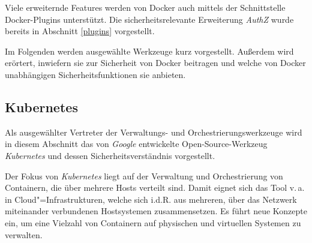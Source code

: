 \documentclass[../main.tex]{subfiles}
\begin{document}
    Viele erweiternde Features werden von Docker auch mittels der Schnittstelle Docker-Plugins unterstützt. Die sicherheitsrelevante Erweiterung \emph{AuthZ} wurde bereits in Abschnitt \ref{plugins} vorgestellt.

    Im Folgenden werden ausgewählte Werkzeuge kurz vorgestellt. Außerdem wird erörtert, inwiefern sie zur Sicherheit von Docker beitragen und welche von Docker unabhängigen Sicherheitsfunktionen sie anbieten.



    \subsection{Kubernetes}
      Als ausgewählter Vertreter der Verwaltungs- und Orchestrierungswerkzeuge wird in diesem Abschnitt das von \emph{Google} entwickelte Open-Source-Werkzeug \emph{Kubernetes} und dessen Sicherheitsverständnis vorgestellt.

      Der Fokus von \emph{Kubernetes} liegt auf der Verwaltung und Orchestrierung von Containern, die über mehrere Hosts verteilt sind. Damit eignet sich das Tool v.\,a. in Cloud"=Infrastrukturen, welche sich i.d.R. aus mehreren, über das Netzwerk miteinander verbundenen Hostsystemen zusammensetzen. Es führt neue Konzepte ein, um eine Vielzahl von Containern auf physischen und virtuellen Systemen zu verwalten.

\end{document}
